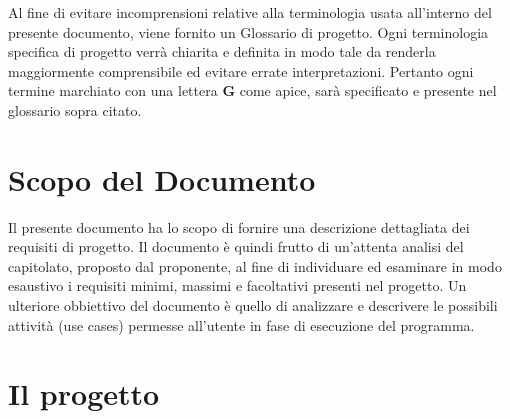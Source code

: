 \begin{beginningnote}
    Al fine di evitare incomprensioni relative alla terminologia usata all’interno del presente documento, viene fornito un Glossario di progetto. 
    Ogni terminologia specifica di progetto verrà chiarita e definita in modo tale da renderla maggiormente comprensibile ed evitare errate interpretazioni. 
    Pertanto ogni termine marchiato con una lettera \textbf{G} come apice, sarà specificato e presente nel glossario sopra citato.
\end{beginningnote}

\section{Scopo del Documento}\label{sec:scopo_del_documento}
Il presente documento ha lo scopo di fornire una descrizione dettagliata dei requisiti di progetto. Il documento è quindi frutto di un'attenta analisi del capitolato, proposto dal proponente, al fine di individuare ed esaminare in modo esaustivo i requisiti minimi, massimi e facoltativi presenti nel progetto. 
Un ulteriore obbiettivo del documento è quello di analizzare e descrivere le possibili attività (use cases) permesse all'utente in fase di esecuzione del programma. 

\section{Il progetto}\label{sec:progetto}
